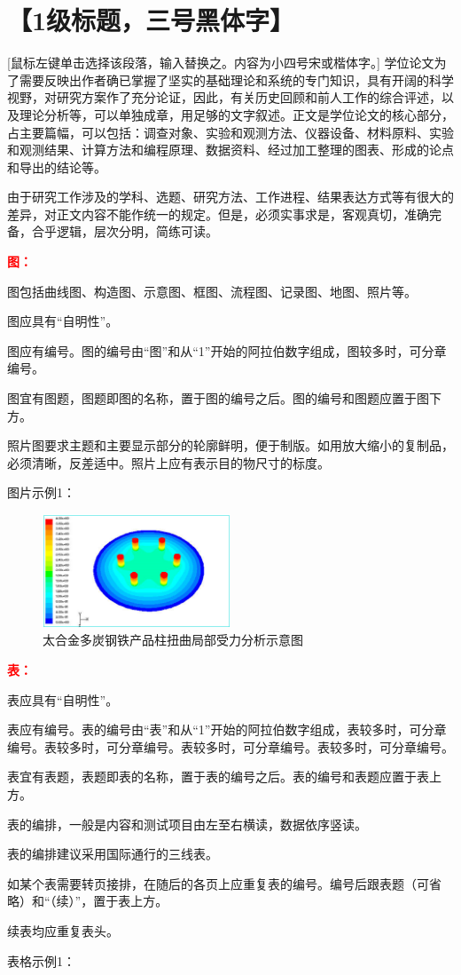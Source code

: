 \documentclass{bjtu-bachelor-thesis}
\begin{document}
\chapter{【1级标题，三号黑体字】}
 [鼠标左键单击选择该段落，输入替换之。内容为小四号宋或楷体字。] 学位论文为了需要反映出作者确已掌握了坚实的基础理论和系统的专门知识，具有开阔的科学视野，对研究方案作了充分论证，因此，有关历史回顾和前人工作的综合评述，以及理论分析等，可以单独成章，用足够的文字叙述。正文是学位论文的核心部分，占主要篇幅，可以包括：调查对象、实验和观测方法、仪器设备、材料原料、实验和观测结果、计算方法和编程原理、数据资料、经过加工整理的图表、形成的论点和导出的结论等。\par
由于研究工作涉及的学科、选题、研究方法、工作进程、结果表达方式等有很大的差异，对正文内容不能作统一的规定。但是，必须实事求是，客观真切，准确完备，合乎逻辑，层次分明，简练可读。\par
\textcolor{red}{\textbf{图：}}\par
图包括曲线图、构造图、示意图、框图、流程图、记录图、地图、照片等。\par
图应具有“自明性”。\par
图应有编号。图的编号由“图”和从“1”开始的阿拉伯数字组成，图较多时，可分章编号。\par
图宜有图题，图题即图的名称，置于图的编号之后。图的编号和图题应置于图下方。\par
照片图要求主题和主要显示部分的轮廓鲜明，便于制版。如用放大缩小的复制品，必须清晰，反差适中。照片上应有表示目的物尺寸的标度。\par
图片示例1：
\begin{figure}[!htp]
    \centering
    \includegraphics[width=0.5\textwidth]{pic/pic2-1.png}
    \caption{太合金多炭钢铁产品柱扭曲局部受力分析示意图\label{fig:2-1}}
\end{figure}

\textcolor{red}{\textbf{表：}}\par
表应具有“自明性”。\par
表应有编号。表的编号由“表”和从“1”开始的阿拉伯数字组成，表较多时，可分章编号。表较多时，可分章编号。表较多时，可分章编号。表较多时，可分章编号。\par
表宜有表题，表题即表的名称，置于表的编号之后。表的编号和表题应置于表上方。\par
表的编排，一般是内容和测试项目由左至右横读，数据依序竖读。\par
表的编排建议采用国际通行的三线表。\par
如某个表需要转页接排，在随后的各页上应重复表的编号。编号后跟表题（可省略）和“（续）”，置于表上方。\par
续表均应重复表头。\par
表格示例1：
\end{document}
